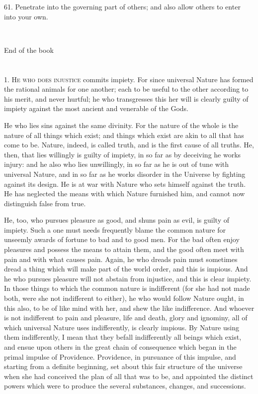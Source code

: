 \documentclass{book}
\newcommand\terminus[1]{\vspace{2em}\emph{#1} \\[2em] \begin{center}End of the \ordinalstring{chapter} book\end{center}}
\begin{document}
61. Penetrate into the governing part of others; and also allow others
to enter into your own.

\terminus{}
\chapter[He who does injustice...]{}

1. \textsc{He who does injustice} commits impiety. For since universal Nature
has formed the rational animals for one another; each to be useful to
the other according to his merit, and never hurtful; he who
transgresses this her will is clearly guilty of impiety against the
most ancient and venerable of the Gods.

He who lies sins against the same divinity. For the nature of the
whole is the nature of all things which exist; and things which exist
are akin to all that has come to be. Nature, indeed, is called truth,
and is the first cause of all truths. He, then, that lies willingly is
guilty of impiety, in so far as by deceiving he works injury: and he
also who lies unwillingly, in so far as he is out of tune with
universal Nature, and in so far as he works disorder in the Universe
by fighting against its design. He is at war with Nature who sets
himself against the truth. He has neglected the means with which
Nature furnished him, and cannot now distinguish false from true.

He, too, who pursues pleasure as good, and shuns pain as evil, is
guilty of impiety. Such a one must needs frequently blame the common
nature for unseemly awards of fortune to bad and to good men. For the
bad often enjoy pleasures and possess the means to attain them, and
the good often meet with pain and with what causes pain. Again, he who
dreads pain must sometimes dread a thing which will make part of the
world order, and this is impious. And he who pursues pleasure will not
abstain from injustice, and this is clear impiety. In those things to
which the common nature is indifferent (for she had not made both,
were she not indifferent to either), he who would follow Nature ought,
in this also, to be of like mind with her, and shew the like
indifference. And whoever is not indifferent to pain and pleasure,
life and death, glory and ignominy, all of which universal Nature uses
indifferently, is clearly impious. By Nature using them indifferently,
I mean that they befall indifferently all beings which exist, and
ensue upon others in the great chain of consequence which began in the
primal impulse of Providence. Providence, in pursuance of this
impulse, and starting from a definite beginning, set about this fair
structure of the universe when she had conceived the plan of all that
was to be, and appointed the distinct powers which were to produce the
several substances, changes, and successions.
\end{document}
